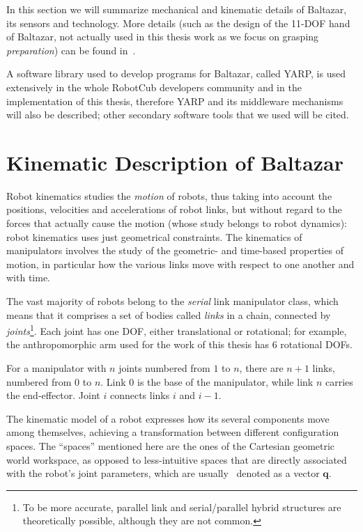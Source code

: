 In this section we will summarize mechanical and kinematic details of Baltazar, its sensors and technology. More details (such as the design of the 11-\ac{DOF} hand of Baltazar, not actually used in this thesis work as we focus on grasping \emph{preparation}) can be found in~\cite[p.~113]{lopes:phd}.

A software library used to develop programs for Baltazar, called \ac{YARP}, is used extensively in the whole \ac{RobotCub} developers community and in the implementation of this thesis, therefore \ac{YARP} and its middleware mechanisms will also be described; other secondary software tools that we used will be cited.

\section{Kinematic Description of Baltazar}

Robot kinematics studies the \emph{motion} of robots, thus taking into account the positions, velocities and accelerations of robot links, but without regard to the forces that actually cause the motion (whose study belongs to robot dynamics): robot kinematics uses just geometrical constraints. The kinematics of manipulators involves the study of the geometric- and time-based properties of motion, in particular how the various links move with respect to one another and with time.

The vast majority of robots belong to the \emph{serial} link manipulator class, which means that it comprises a set of bodies called \emph{links} in a chain, connected by \emph{joints}\footnote{To be more accurate, parallel link and serial/parallel hybrid structures are theoretically possible, although they are not common.}. Each joint has one \ac{DOF}, either translational or rotational; for example, the anthropomorphic arm used for the work of this thesis has 6 rotational \acp{DOF}.

For a manipulator with $n$ joints numbered from $1$ to $n$, there are $n+1$ links, numbered from $0$ to $n$. Link $0$ is the base of the manipulator, while link $n$ carries the end-effector. Joint $i$ connects links $i$ and $i-1$.

The kinematic model of a robot expresses how its several components move among themselves, achieving a transformation between different configuration spaces. The ``spaces'' mentioned here are the ones of the Cartesian geometric world workspace, as opposed to less-intuitive spaces that are directly associated with the robot's joint parameters, which are usually~\cite{craig, sciavicco_siciliano} denoted as a vector $\mathbf{q}$.


